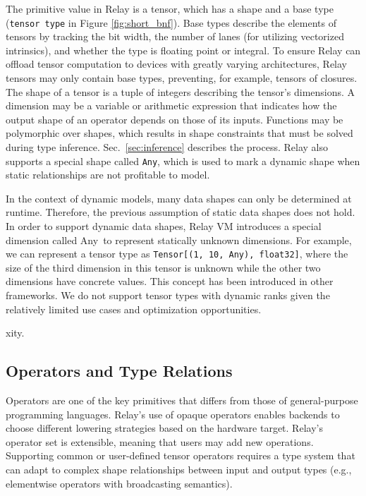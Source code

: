 The primitive value in Relay is a tensor, which has
  a shape and a base type (\verb|tensor type| in Figure \ref{fig:short_bnf}).
Base types describe the elements of tensors by tracking
  the bit width,
  the number of lanes (for utilizing vectorized intrinsics),
  and whether the type is floating point or integral.
To ensure Relay can offload tensor computation to devices
  with greatly varying architectures,
  Relay tensors may only contain base types,
  preventing, for example, tensors of closures.
The shape of a tensor is a tuple of integers describing the tensor's dimensions.
A dimension may be a variable or arithmetic expression that indicates how the
  output shape of an operator depends on those of its inputs.
Functions may be polymorphic over shapes, which results
  in shape constraints that must be solved during type inference.
Sec.~\ref{sec:inference} describes the process.
Relay also supports a special shape called \verb|Any|, which is used
  to mark a dynamic shape when static relationships are not profitable
  to model.

In the context of dynamic models, many data shapes can only be determined at runtime.
Therefore, the previous assumption of static data shapes does not hold.
In order to support dynamic data shapes, Relay VM introduces a special dimension called
  Any~to represent statically unknown dimensions.
For example, we can represent a tensor type as \texttt{Tensor[(1, 10, Any), float32]},
  where the size of the third dimension in this tensor is unknown while the other
  two dimensions have concrete values.
This concept has been introduced in other frameworks.
We do not support tensor types with dynamic ranks given the relatively limited use cases and optimization opportunities.

xity.

\subsection*{Operators and Type Relations}
Operators are one of the key primitives that differs from those of
general-purpose programming languages.
Relay's use of opaque operators enables backends to choose different
lowering strategies based on the hardware target.
Relay's operator set is extensible, meaning that users may add new operations.
Supporting common or user-defined tensor operators requires a type system that can
adapt to complex shape relationships between input and output types
(e.g., elementwise operators with broadcasting semantics).

